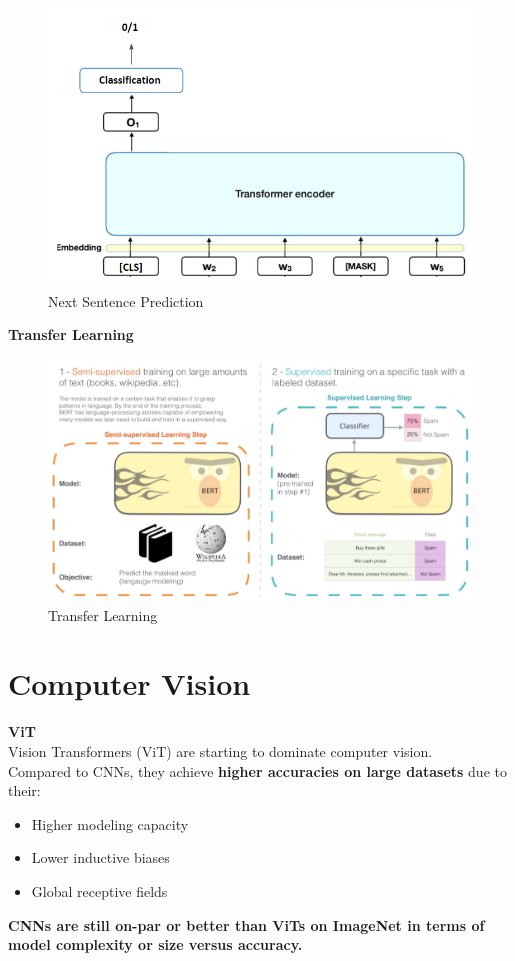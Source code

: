 \begin{figure}[h!t]
    \centering
    \includegraphics[width=0.75\linewidth]{nextsentencepred.png}
    \caption{Next Sentence Prediction}
    \label{fig:enter-label}
\end{figure}

\newpage

\noindent
\textbf{Transfer Learning}

\begin{figure}[h!t]
    \centering
    \includegraphics[width=1\linewidth]{transferlearningtransformers.png}
    \caption{Transfer Learning}
    \label{fig:enter-label}
\end{figure}

\section{Computer Vision}
\noindent
\textbf{ViT}\\
Vision Transformers (ViT) are starting to dominate computer vision.\\
Compared to CNNs, they achieve \textbf{higher accuracies on large datasets} due to their:
\begin{itemize}
    \item Higher modeling capacity
    \item Lower inductive biases
    \item Global receptive fields
\end{itemize}
\textbf{CNNs are still on-par or better than ViTs on ImageNet in terms of model complexity
or size versus accuracy.}

